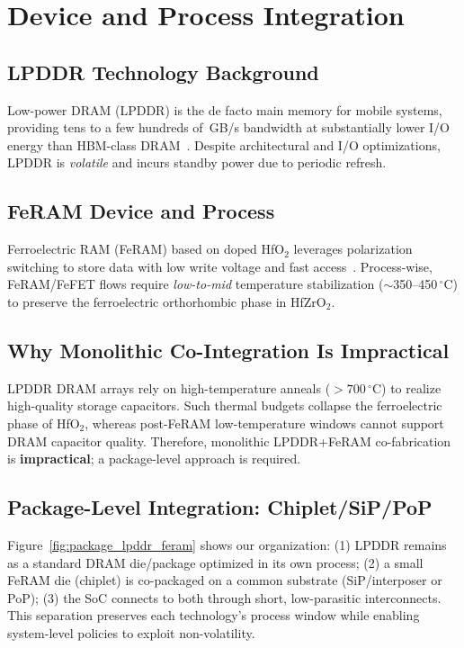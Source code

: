 \section{Device and Process Integration}

\subsection{LPDDR Technology Background}
Low-power DRAM (LPDDR) is the de facto main memory for mobile systems, providing tens to a few hundreds of~GB/s bandwidth
at substantially lower I/O energy than HBM-class DRAM~\cite{ChoiIEDM2022}.
Despite architectural and I/O optimizations, LPDDR is \emph{volatile} and incurs standby power due to periodic refresh.



\subsection{FeRAM Device and Process}
Ferroelectric RAM (FeRAM) based on doped HfO$_2$ leverages polarization switching to store data with low write voltage and fast access~\cite{MullerAPL2011,KimIEDM2021,NohedaNRM2023}.
Process-wise, FeRAM/FeFET flows require \emph{low-to-mid} temperature stabilization ($\sim$350--450$\,^\circ\mathrm{C}$) to preserve the ferroelectric orthorhombic phase in HfZrO$_2$.

\subsection{Why Monolithic Co-Integration Is Impractical}
LPDDR DRAM arrays rely on high-temperature anneals ($>700\,^\circ\mathrm{C}$) to realize high-quality storage capacitors.
Such thermal budgets collapse the ferroelectric phase of HfO$_2$, whereas post-FeRAM low-temperature windows cannot support DRAM capacitor quality.
Therefore, monolithic LPDDR+FeRAM co-fabrication is \textbf{impractical}; a package-level approach is required.

\subsection{Package-Level Integration: Chiplet/SiP/PoP}
Figure~\ref{fig:package_lpddr_feram} shows our organization:
(1) LPDDR remains as a standard DRAM die/package optimized in its own process;
(2) a small FeRAM die (chiplet) is co-packaged on a common substrate (SiP/interposer or PoP);
(3) the SoC connects to both through short, low-parasitic interconnects.
This separation preserves each technology's process window while enabling system-level policies to exploit non-volatility.

